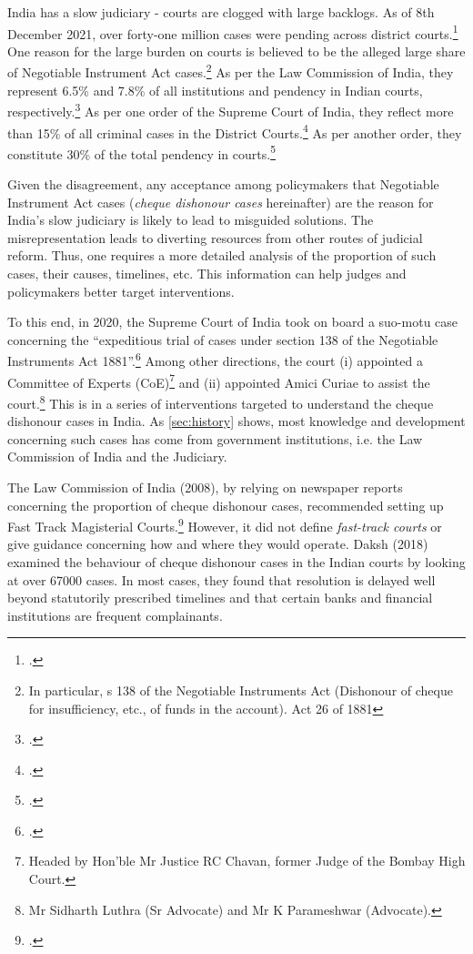 India has a slow judiciary - courts are clogged with large backlogs. As of 8th December 2021, over forty-one million cases were pending across district courts.\footcite{njdg2021} One reason for the large burden on courts is believed to be the alleged large share of Negotiable Instrument Act cases.\footnote{In particular, s 138 of the Negotiable Instruments Act (Dishonour of cheque for insufficiency, etc., of funds in the account). Act 26 of 1881} As per the Law Commission of India, they represent 6.5\% and 7.8\% of all institutions and pendency in Indian courts, respectively.\footcite{lci2014_arrears} As per one order of the Supreme Court of India, they reflect more than 15\% of all criminal cases in the District Courts.\footcite{sc2020_makwanavstate} As per another order, they constitute 30\% of the total pendency in courts.\footcite{sc2020_138}

Given the disagreement, any acceptance among policymakers that Negotiable Instrument Act cases (\textit{cheque dishonour cases} hereinafter) are the reason for India's slow judiciary is likely to lead to misguided solutions. The misrepresentation leads to diverting resources from other routes of judicial reform. Thus, one requires a more detailed analysis of the proportion of such cases, their causes, timelines, etc. This information can help judges and policymakers better target interventions.

To this end, in 2020, the Supreme Court of India took on board a suo-motu case concerning the “expeditious trial of cases under section 138 of the Negotiable Instruments Act 1881”.\footcite{sc2020_138} Among other directions, the court (i) appointed a Committee of Experts (CoE)\footnote{Headed by Hon’ble Mr Justice RC Chavan, former Judge of the Bombay High Court.} and (ii) appointed Amici Curiae to assist the court.\footnote{Mr Sidharth Luthra (Sr Advocate) and Mr K Parameshwar (Advocate).} This is in a series of interventions targeted to understand the cheque dishonour cases in India. As \cref{sec:history} shows, most knowledge and development concerning such cases has come from government institutions, i.e. the Law Commission of India and the Judiciary.

The Law Commission of India (2008), by relying on newspaper reports concerning the proportion of cheque dishonour cases, recommended setting up Fast Track Magisterial Courts.\footcite{lci2008_138, bhan2015_placing} However, it did not define \textit{fast-track courts} or give guidance concerning how and where they would operate. Daksh (2018) examined the behaviour of cheque dishonour cases in the Indian courts by looking at over 67000 cases. In most cases, they found that resolution is delayed well beyond statutorily prescribed timelines and that certain banks and financial institutions are frequent complainants.

